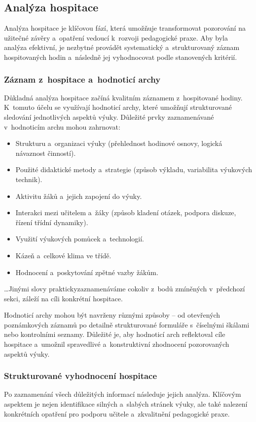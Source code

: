 \subsection{Analýza hospitace}
Analýza hospitace je klíčovou fází, která umožňuje transformovat pozorování na užitečné závěry a~opatření vedoucí k~rozvoji pedagogické praxe. Aby byla analýza efektivní, je nezbytné provádět systematický a~strukturovaný záznam hospitovaných hodin a~následně jej vyhodnocovat podle stanovených kritérií.

\subsubsection{Záznam z~hospitace a~hodnoticí archy}
Důkladná analýza hospitace začíná kvalitním záznamem z~hospitované hodiny. K~tomuto účelu se využívají hodnoticí archy, které umožňují strukturované sledování jednotlivých aspektů výuky. Důležité prvky zaznamenávané v~hodnoticím archu mohou zahrnovat:
\begin{itemize}
    \item Strukturu a~organizaci výuky (přehlednost hodinové osnovy, logická návaznost činností).
    \item Použité didaktické metody a~strategie (způsob výkladu, variabilita výukových technik).
    \item Aktivitu žáků a~jejich zapojení do výuky.
    \item Interakci mezi učitelem a~žáky (způsob kladení otázek, podpora diskuze, řízení třídní dynamiky).
    \item Využití výukových pomůcek a~technologií.
    \item Kázeň a~celkové klima ve třídě.
    \item Hodnocení a~poskytování zpětné vazby žákům.
\end{itemize}

\ldots{}Jinými slovy praktickyzaznamenáváme cokoliv z~bodů zmíněných v~předchozí sekci, záleží na cíli konkrétní hospitace.

Hodnoticí archy mohou být navrženy různými způsoby – od otevřených poznámkových záznamů po detailně strukturované formuláře s~číselnými škálami nebo kontrolními seznamy. Důležité je, aby hodnoticí arch reflektoval cíle hospitace a~umožnil spravedlivé a~konstruktivní zhodnocení pozorovaných aspektů výuky.

\subsubsection{Strukturované vyhodnocení hospitace}
Po zaznamenání všech důležitých informací následuje jejich analýza. Klíčovým aspektem je nejen identifikace silných a~slabých stránek výuky, ale také nalezení konkrétních opatření pro podporu učitele a~zkvalitnění pedagogické praxe. 

